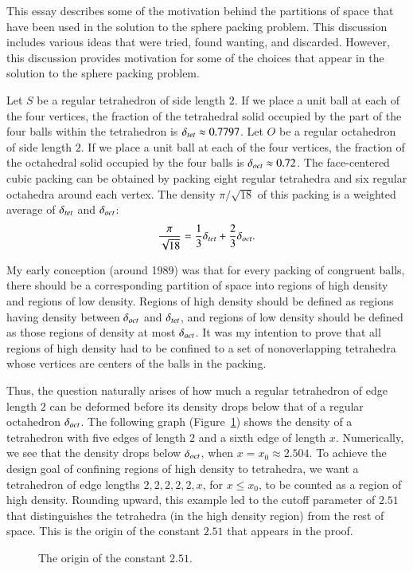 This essay describes some of the
motivation behind the partitions of space that have been used in the
solution to the sphere packing problem.  This discussion includes various
ideas that were tried, found wanting, and discarded. However, this
discussion provides motivation for some of the choices that appear
in the solution to the sphere packing problem.


Let $S$ be a regular tetrahedron of side length $2$.  If we place a
unit ball at each of the four vertices, the fraction of the
tetrahedral solid occupied by the part of the four balls within the
tetrahedron is $\delta_{tet}\approx 0.7797$. Let $O$ be a regular
octahedron of side length $2$.  If we place a unit ball at each of
the four vertices, the fraction of the octahedral solid occupied by
the four balls is $\delta_{oct}\approx 0.72$. The face-centered cubic
packing can be obtained by packing eight regular tetrahedra and six
regular octahedra around each vertex. The density $\pi/\sqrt{18}$ of
this packing is a weighted average of $\delta_{tet}$ and $\delta_{oct}$:
    $$\frac\pi{\sqrt{18}} = \frac13\delta_{tet} + \frac23\delta_{oct}.$$

My early conception (around 1989) was that for every packing of
congruent balls, there should be a corresponding partition of space
into regions of high density and regions of low density. Regions of
high density should be defined as regions having density between
$\delta_{oct}$ and $\delta_{tet}$, and regions of low density should be defined as
those regions of density at most $\delta_{oct}$.  It was my intention to
prove that all regions of high density had to be confined to a set
of nonoverlapping tetrahedra whose vertices are centers of the balls
in the packing.

Thus, the question naturally arises of how much a regular
tetrahedron of edge length $2$ can be deformed before its density
drops below that of a regular octahedron $\delta_{oct}$.  The following
graph (Figure~\ref{fig:t51}) shows the density of a tetrahedron with
five edges of length $2$ and a sixth edge of length $x$.
Numerically, we see that the density drops below $\delta_{oct}$, when
$x=x_0\approx 2.504$. To achieve the design goal of confining
regions of high density to tetrahedra, we want a tetrahedron of edge
lengths $2,2,2,2,2,x$, for $x\le x_0$, to be counted as a region of
high density. Rounding upward, this example led to the cutoff
parameter of $2.51$ that distinguishes the tetrahedra (in the high
density region) from the rest of space. This is the origin of the
constant $2.51$ that appears in the proof.


\begin{figure}[htb]
  \centering
  \caption{The origin of the constant $2.51$.}
  \label{fig:t51}
\end{figure}

